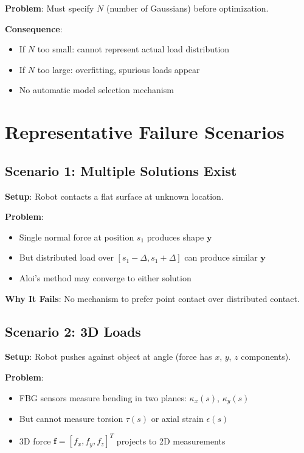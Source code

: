 \documentclass[11pt]{article}
\begin{document}
\textbf{Problem}: Must specify $N$ (number of Gaussians) before optimization.

\textbf{Consequence}:
\begin{itemize}
    \item If $N$ too small: cannot represent actual load distribution
    \item If $N$ too large: overfitting, spurious loads appear
    \item No automatic model selection mechanism
\end{itemize}

\section{Representative Failure Scenarios}

\subsection{Scenario 1: Multiple Solutions Exist}

\textbf{Setup}: Robot contacts a flat surface at unknown location.

\textbf{Problem}:
\begin{itemize}
    \item Single normal force at position $s_1$ produces shape $\mathbf{y}$
    \item But distributed load over $[s_1 - \Delta, s_1 + \Delta]$ can produce similar $\mathbf{y}$
    \item Aloi's method may converge to either solution
\end{itemize}

\textbf{Why It Fails}: No mechanism to prefer point contact over distributed contact.

\subsection{Scenario 2: 3D Loads}

\textbf{Setup}: Robot pushes against object at angle (force has $x$, $y$, $z$ components).

\textbf{Problem}:
\begin{itemize}
    \item FBG sensors measure bending in two planes: $\kappa_x(s)$, $\kappa_y(s)$
    \item But cannot measure torsion $\tau(s)$ or axial strain $\epsilon(s)$
    \item 3D force $\mathbf{f} = [f_x, f_y, f_z]^T$ projects to 2D measurements
\end{itemize}
\end{document}

